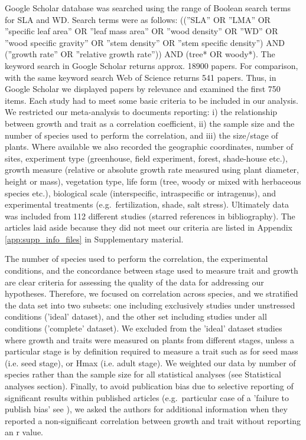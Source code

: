 \documentclass[a4paper]{article}\usepackage[]{graphicx}\usepackage[]{color}
\begin{document}
Google Scholar database was searched using the range of Boolean search terms for SLA and WD. Search terms were as follows: ((''SLA'' OR ''LMA'' OR ''specific leaf area'' OR ''leaf mass area'' OR ''wood density'' OR ''WD'' OR ''wood specific gravity'' OR ''stem density'' OR ''stem specific density'') AND (''growth rate'' OR ''relative growth rate'')) AND (tree* OR woody*). The keyword search in Google Scholar returns approx. 18900 papers. For comparison, with the same keyword search Web of Science returns 541 papers. Thus, in Google Scholar we displayed papers by relevance and examined the first 750 items. 
Each study had to meet some basic criteria to be included in our analysis. We restricted our meta-analysis to documents reporting: i) the relationship between growth and trait as a correlation coefficient, ii) the sample size and the number of species used to perform the correlation, and iii) the size/stage of plants. Where available we also recorded the geographic coordinates, number of sites, experiment type (greenhouse, field experiment, forest, shade-house etc.), growth measure (relative or absolute growth rate measured using plant diameter, height or mass), vegetation type, life form (tree, woody or mixed with herbaceous species etc.), biological scale (interspecific, intraspecific or intragenus), and experimental treatments (e.g.~fertilization, shade, salt stress). Ultimately data was included from 112 different studies (starred references in bibliography). The articles laid aside because they did not meet our criteria are listed in Appendix \ref{app:supp_info_files} in Supplementary material.

The number of species used to perform the correlation, the experimental conditions, and the concordance between stage used to measure trait and growth are clear criteria for assessing the quality of the data for addressing our hypotheses. Therefore, we focused on correlation across species, and we stratified the data set into two subsets: one including exclusively studies under unstressed conditions ('ideal' dataset), and the other set including studies under all conditions ('complete' dataset). We excluded from the 'ideal' dataset studies where growth and traits were measured on plants from different stages, unless a particular stage is by definition required to measure a trait such as for seed mass (i.e. seed stage), or Hmax (i.e. adult stage). We weighted our data by number of species rather than the sample size for all statistical analyses (see Statistical analyses section). Finally, to avoid publication bias due to selective reporting of significant results within published articles (e.g.~particular case of a 'failure to publish bias' see \citealt{Jennions:2013ta}), we asked the authors for additional information when they reported a non-significant correlation between growth and trait without reporting an r value.
\end{document}
